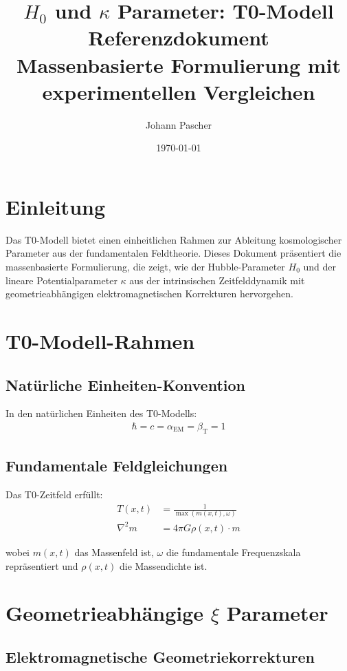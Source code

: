 \documentclass[12pt,a4paper]{article}
\title{$H_0$ und $\kappa$ Parameter: T0-Modell Referenzdokument\\
	Massenbasierte Formulierung mit experimentellen Vergleichen}
\author{Johann Pascher}
\date{\today}
\begin{document}
	
	\maketitle
	
	\section{Einleitung}
	
	Das T0-Modell bietet einen einheitlichen Rahmen zur Ableitung kosmologischer Parameter aus der fundamentalen Feldtheorie. Dieses Dokument präsentiert die massenbasierte Formulierung, die zeigt, wie der Hubble-Parameter $H_0$ und der lineare Potentialparameter $\kappa$ aus der intrinsischen Zeitfelddynamik mit geometrieabhängigen elektromagnetischen Korrekturen hervorgehen.
	
	\section{T0-Modell-Rahmen}
	
	\subsection{Natürliche Einheiten-Konvention}
	In den natürlichen Einheiten des T0-Modells:
	\begin{align}
		\hbar = c = \alpha_{\text{EM}} = \beta_{\text{T}} = 1
	\end{align}
	
	\subsection{Fundamentale Feldgleichungen}
	Das T0-Zeitfeld erfüllt:
	\begin{align}
		T(x,t) &= \frac{1}{\max(m(x,t), \omega)} \\
		\nabla^2 m &= 4\pi G \rho(x,t) \cdot m
	\end{align}
	
	wobei $m(x,t)$ das Massenfeld ist, $\omega$ die fundamentale Frequenzskala repräsentiert und $\rho(x,t)$ die Massendichte ist.
	
	\section{Geometrieabhängige $\xi$ Parameter}
	
	\subsection{Elektromagnetische Geometriekorrekturen}
	
\end{document}
